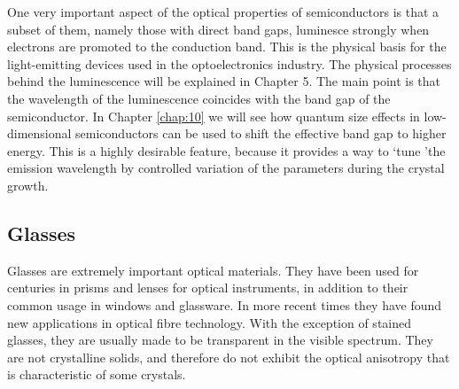 \documentclass[12pt]{book}
\begin{document}
One very important aspect of the optical properties of semiconductors is that a subset of them, namely those with direct band gaps, luminesce strongly when electrons are promoted to the conduction band. This is the physical basis for the light-emitting devices used in the optoelectronics industry. The physical processes behind the luminescence will be explained in Chapter 5. The main point is that the wavelength of the luminescence coincides with the band gap of the semiconductor. In Chapter \ref{chap:10} we will see how quantum size effects in low-dimensional semiconductors can be used to shift the effective band gap to higher energy. This is a highly desirable feature, because it provides a way to \lq tune \rq the emission wavelength by controlled variation of the parameters during the crystal growth.


\subsection{Glasses}

Glasses are extremely important optical materials. They have been used for centuries in prisms and lenses for optical instruments, in addition to their common usage in windows and glassware. In more recent times they have found new applications in optical fibre technology. With the exception of stained glasses, they are usually made to be transparent in the visible spectrum. They are not crystalline solids, and therefore do not exhibit the optical anisotropy that is characteristic of some crystals.
\end{document}
